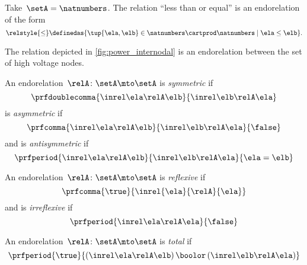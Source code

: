 \begin{example}
	Take~$\setA=\natnumbers$.
	The relation ``less than or equal'' is an endorelation of the form
	\begin{equation}
		\relstyle{\leq} \definedas  \{\tup{\ela,\elb}\in \natnumbers\cartprod \natnumbers\mid \ela \leq \elb\}.
	\end{equation}
\end{example}

\begin{example}
	The relation depicted in \cref{fig:power_internodal} is an endorelation between the set of high voltage nodes.
\end{example}

\begin{ctdefinition}
	\label{def:endo_sym_asym_antisym}
	\label{def:antisymmetry}
	An endorelation~$\relA\colon \setA\mto \setA$ is \emph{symmetric} if
	\begin{equation}
		\prfdoublecomma{
			\inrel \ela \relA \elb
		}{
			\inrel \elb \relA \ela
		}
	\end{equation}
	is \emph{asymmetric} if
	\begin{equation}
		\prfcomma{
			\inrel \ela \relA \elb
		}{
			\inrel \elb \relA \ela
		}{
			\false
		}
	\end{equation}
	and is \emph{antisymmetric} if
	\begin{equation}
		\prfperiod{
			\inrel \ela \relA \elb
		}{
			\inrel \elb \relA \ela
		}{
			\ela = \elb
		}
	\end{equation}
\end{ctdefinition}

\begin{ctdefinition}
	\label{def:endo_reflexive_irreflexive}
	An endorelation~$\relA\colon \setA\mto \setA$ is \emph{reflexive} if
	\begin{equation}
		\prfcomma{\true}{\inrel{\ela}{\relA}{\ela}}
	\end{equation}
	and is \emph{irreflexive} if
	\begin{equation}
		\prfperiod{
			\inrel \ela \relA \ela
		}{
			\false
		}
	\end{equation}
\end{ctdefinition}

\begin{ctdefinition}
	\label{def:endo_total}
	An endorelation~$\relA\colon \setA\mto \setA$ is \emph{total} if
	\begin{equation}
		\prfperiod{
			\true
		}{
			(\inrel\ela\relA\elb )\,\boolor\, (\inrel\elb\relA\ela)
		}
	\end{equation}

\end{ctdefinition}

